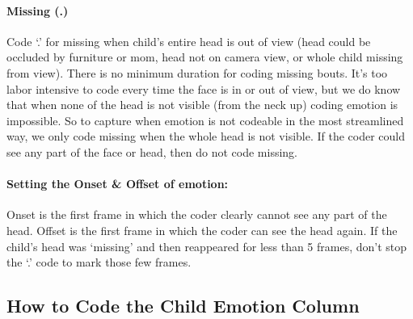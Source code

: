 \documentclass[
  12pt,
]{book}
\begin{document}
\hypertarget{child_head_not_visible}{%
\paragraph*{Missing (.)}\label{child_head_not_visible}}

Code `.' for missing when child's entire head is out of view (head could be occluded by furniture or mom, head not on camera view, or whole child missing from view). There is no minimum duration for coding missing bouts. It's too labor intensive to code every time the face is in or out of view, but we do know that when none of the head is not visible (from the neck up) coding emotion is impossible. So to capture when emotion is not codeable in the most streamlined way, we only code missing when the whole head is not visible. If the coder could see any part of the face or head, then do not code missing.

\hypertarget{setting-the-onset-offset-of-emotion-1}{%
\paragraph{Setting the Onset \& Offset of emotion:}\label{setting-the-onset-offset-of-emotion-1}}

Onset is the first frame in which the coder clearly cannot see any part of the head.
Offset is the first frame in which the coder can see the head again.
If the child's head was `missing' and then reappeared for less than 5 frames, don't stop the `.' code to mark those few frames.

\hypertarget{how-to-code-the-child-emotion-column}{%
\subsection*{How to Code the Child Emotion Column}\label{how-to-code-the-child-emotion-column}}
\end{document}
